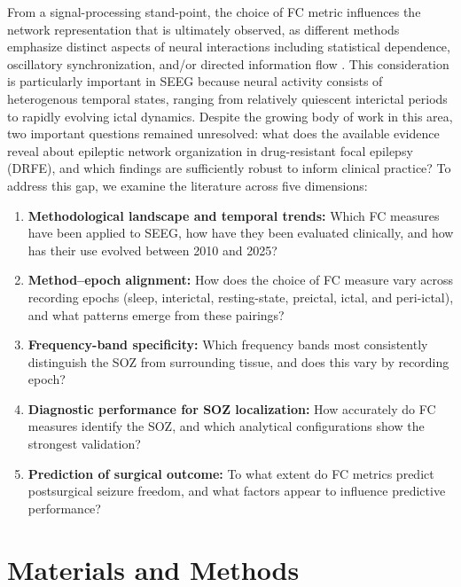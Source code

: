 \documentclass[12pt]{article}
\begin{document}
From a signal-processing stand-point, the choice of FC metric influences the network representation that is ultimately observed, as different methods emphasize distinct aspects of neural interactions including statistical dependence, oscillatory synchronization, and/or directed information flow \cite{Lithari2012-lh}. This consideration is particularly important in SEEG because neural activity consists of heterogenous temporal states, ranging from relatively quiescent interictal periods to rapidly evolving ictal dynamics. Despite the growing body of work in this area, two important questions remained unresolved: what does the available evidence reveal about epileptic network organization in drug-resistant focal epilepsy (DRFE), and which findings are sufficiently robust to inform clinical practice? To address this gap, we examine the literature across five dimensions:

\begin{enumerate}
  \item \textbf{Methodological landscape and temporal trends:} Which FC measures have been applied to SEEG, how have they been evaluated clinically, and how has their use evolved between 2010 and 2025?

  \item \textbf{Method--epoch alignment:} How does the choice of FC measure vary across recording epochs (sleep, interictal, resting-state, preictal, ictal, and peri-ictal), and what patterns emerge from these pairings?

  \item \textbf{Frequency-band specificity:} Which frequency bands most consistently distinguish the SOZ from surrounding tissue, and does this vary by recording epoch?

  \item \textbf{Diagnostic performance for SOZ localization:} How accurately do FC measures identify the SOZ, and which analytical configurations show the strongest validation?

  \item \textbf{Prediction of surgical outcome:} To what extent do FC metrics predict postsurgical seizure freedom, and what factors appear to influence predictive performance?

\end{enumerate}


\section{Materials and Methods}
\end{document}

